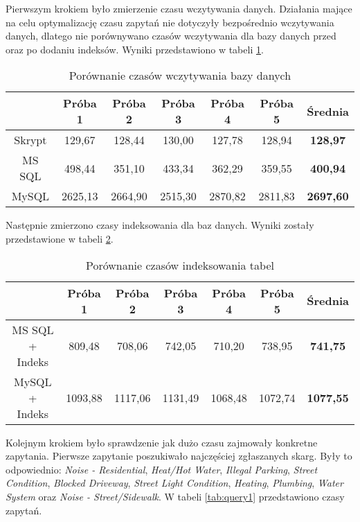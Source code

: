 \documentclass[a4paper,11pt]{article}
\begin{document}
Pierwszym krokiem było zmierzenie czasu wczytywania danych. Działania mające na celu optymalizację czasu zapytań nie dotyczyły bezpośrednio wczytywania danych, dlatego nie porównywano czasów wczytywania dla bazy danych przed oraz po dodaniu indeksów. Wyniki przedstawiono w tabeli \ref{tab:loading}.

\begin{table}[h!]
\begin{center}
\caption{Porównanie czasów wczytywania bazy danych}
\label{tab:loading}
\begin{tabular}{|c|c|c|c|c|c|c|}
\hline
 & Próba 1 & Próba 2 & Próba 3 & Próba 4 & Próba 5 & \textbf{Średnia} \\ \hline
Skrypt & 129,67 & 128,44 & 130,00 & 127,78 & 128,94 & \textbf{128,97} \\ \hline
MS SQL & 498,44 & 351,10 & 433,34 & 362,29 & 359,55 & \textbf{400,94} \\ \hline
MySQL & 2625,13 & 2664,90 & 2515,30 & 2870,82 & 2811,83 & \textbf{2697,60} \\ \hline
\end{tabular}
\end{center}
\end{table}

Następnie zmierzono czasy indeksowania dla baz danych. Wyniki zostały przedstawione w tabeli \ref{tab:index}.

\begin{table}[h!]
\begin{center}
\caption{Porównanie czasów indeksowania tabel}
\label{tab:index}
\begin{tabular}{|c|c|c|c|c|c|c|}
\hline
 & Próba 1 & Próba 2 & Próba 3 & Próba 4 & Próba 5 & \textbf{Średnia} \\ \hline
MS SQL + Indeks & 809,48 & 708,06 & 742,05 & 710,20 & 738,95 & \textbf{741,75} \\ \hline
MySQL + Indeks & 1093,88 & 1117,06 & 1131,49 & 1068,48 & 1072,74 & \textbf{1077,55} \\ \hline
\end{tabular}
\end{center}
\end{table}

Kolejnym krokiem było sprawdzenie jak dużo czasu zajmowały konkretne zapytania. Pierwsze zapytanie poszukiwało najczęściej zgłaszanych skarg. Były to odpowiednio: \textit{Noise - Residential}, \textit{Heat/Hot Water}, \textit{Illegal Parking}, \textit{Street Condition}, \textit{Blocked Driveway}, \textit{Street Light Condition}, \textit{Heating}, \textit{Plumbing}, \textit{Water System} oraz \textit{Noise - Street/Sidewalk}. W tabeli \ref{tab:query1} przedstawiono czasy zapytań.
\end{document}
